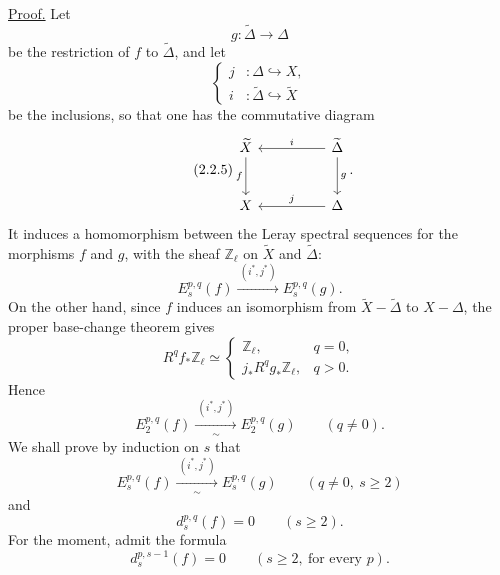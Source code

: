 \noindent\underline{Proof.}
Let
\begin{equation}\tag{2.2.3}
g:\widetilde\Delta\longrightarrow\Delta
\end{equation}
be the restriction of $f$ to $\widetilde\Delta$, and let
\begin{equation}\tag{2.2.4}
\left\{
\begin{aligned}
j&:\Delta\hookrightarrow X,\\
i&:\widetilde\Delta\hookrightarrow\widetilde X
\end{aligned}
\right.
\end{equation}
be the inclusions, so that one has the commutative diagram
\begin{equation}\tag{2.2.5}
\begin{tikzcd}[column sep=huge,row sep=large]
\widetilde X \arrow[d,"f"'] &
\widetilde\Delta \arrow[l,"i"'] \arrow[d,"g"]\\
X & \Delta \arrow[l,"j"']
\end{tikzcd}.
\end{equation}
It induces a homomorphism between the Leray spectral sequences for the
morphisms $f$ and $g$, with the sheaf $\mathbb Z_\ell$ on $\widetilde X$ and
$\widetilde\Delta$:
\begin{equation}\tag{2.2.6}
E_s^{p,q}(f)\xrightarrow{\ (i^*,j^*)\ }E_s^{p,q}(g).
\end{equation}
On the other hand, since $f$ induces an isomorphism from
$\widetilde X-\widetilde\Delta$ to $X-\Delta$, the proper base-change theorem
gives
\begin{equation}\tag{2.2.7}
R^qf_*\mathbb Z_\ell\simeq
\begin{cases}
\mathbb Z_\ell,&q=0,\\[1ex]
j_*R^qg_*\mathbb Z_\ell,&q>0.
\end{cases}
\end{equation}
Hence
\begin{equation}\tag{2.2.8}
E_2^{p,q}(f)
\xrightarrow[\ \sim\ ]{\ (i^*,j^*)\ }
E_2^{p,q}(g)
\qquad(q\ne0).
\end{equation}
We shall prove by induction on $s$ that
\begin{equation}\tag{2.2.9}
E_s^{p,q}(f)
\xrightarrow[\ \sim\ ]{\ (i^*,j^*)\ }
E_s^{p,q}(g)
\qquad(q\ne0,\ s\geq2)
\end{equation}
and
\begin{equation}\tag{2.2.10}
d_s^{p,q}(f)=0\qquad(s\geq2).
\end{equation}
For the moment, admit the formula
\begin{equation}\tag{2.2.11}
d_s^{p,s-1}(f)=0\qquad(s\geq2,\ \text{for every }p).
\end{equation}

